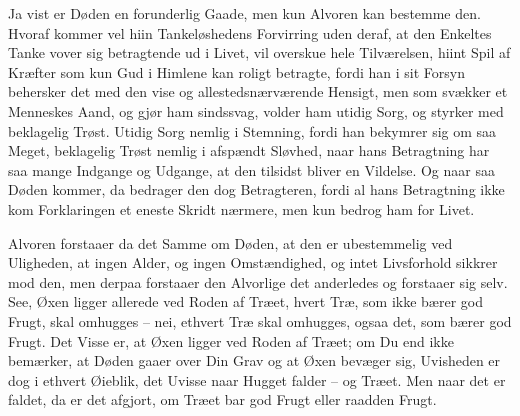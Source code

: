 \documentclass[12pt,a4paper]{article}
\begin{document}
Ja vist er Døden en forunderlig Gaade, men kun Alvoren kan bestemme den. Hvoraf kommer vel hiin Tankeløshedens Forvirring uden deraf, at den Enkeltes Tanke vover sig betragtende ud i Livet, vil overskue hele Tilværelsen, hiint Spil af Kræfter som kun Gud i Himlene kan roligt betragte, fordi han i sit Forsyn behersker det med den vise og allestedsnærværende Hensigt, men som svækker et Menneskes Aand, og gjør ham sindssvag, volder ham utidig Sorg, og styrker med beklagelig Trøst. Utidig Sorg nemlig i Stemning, fordi han bekymrer sig om saa Meget, beklagelig Trøst nemlig i afspændt Sløvhed, naar hans Betragtning har saa mange Indgange og Udgange, at den tilsidst bliver en Vildelse. Og naar saa Døden kommer, da bedrager den dog Betragteren, fordi al hans Betragtning ikke kom Forklaringen et eneste Skridt nærmere, men kun bedrog ham for Livet.

Alvoren forstaaer da det Samme om Døden, at den er ubestemmelig ved Uligheden, at ingen Alder, og ingen Omstændighed, og intet Livsforhold sikkrer mod den, men derpaa forstaaer den Alvorlige det anderledes og forstaaer sig selv. See, Øxen ligger allerede ved Roden af Træet, hvert Træ, som ikke bærer god Frugt, skal omhugges – nei, ethvert Træ skal omhugges, ogsaa det, som bærer god Frugt. Det Visse er, at Øxen ligger ved Roden af Træet; om Du end ikke bemærker, at Døden gaaer over Din Grav og at Øxen bevæger sig, Uvisheden er dog i ethvert Øieblik, det Uvisse naar Hugget falder – og Træet. Men naar det er faldet, da er det afgjort, om Træet bar god Frugt eller raadden Frugt.
\end{document}
